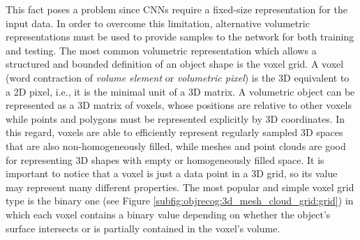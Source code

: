 This fact poses a problem since \acp{CNN} require a fixed-size representation for the input data. In order to overcome this limitation, alternative volumetric representations must be used to provide samples to the network for both training and testing. The most common volumetric representation which allows a structured and bounded definition of an object shape is the voxel grid. A voxel (word contraction of \emph{volume element} or \emph{volumetric pixel}) is the \acs{3D} equivalent to a \acs{2D} pixel, i.e., it is the minimal unit of a \acl{3D} matrix. A volumetric object can be represented as a \ac{3D} matrix of voxels, whose positions are relative to other voxels while points and polygons must be represented explicitly by \ac{3D} coordinates. In this regard, voxels are able to efficiently represent regularly sampled \acs{3D} spaces that are also non-homogeneously filled, while meshes and point clouds are good for representing \acs{3D} shapes with empty or homogeneously filled space. It is important to notice that a voxel is just a data point in a \acl{3D} grid, so its value may represent many different properties. The most popular and simple voxel grid type is the binary one (see Figure \ref{subfig:objrecog:3d_mesh_cloud_grid:grid}) in which each voxel contains a binary value depending on whether the object's surface intersects or is partially contained in the voxel's volume.

